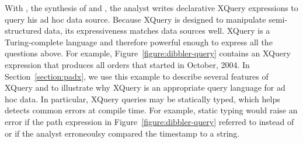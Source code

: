 With \padx{}, the synthesis of \pads{} and \Galax{}, the analyst
writes declarative XQuery expressions to query his ad hoc data source.
Because XQuery is designed to manipulate semi-structured data, its
expressiveness matches \pads{} data sources well.  XQuery is a
Turing-complete language and therefore powerful
enough to express all the questions above.  For example,
Figure~\ref{figure:dibbler-query} contains an XQuery expression that
produces all orders that started in October, 2004.  In
Section~\ref{section:padx}, we use this example to describe several
features of XQuery and to illustrate why XQuery is an appropriate
query language for ad hoc data.  In particular, XQuery queries may be
statically typed, which helps detects common errors at compile time.
For example, static typing would raise an error if the path expression
in Figure~\ref{figure:dibbler-query} referred to  instead
of  or if the analyst erroneoulsy compared the timestamp
 to a string.
